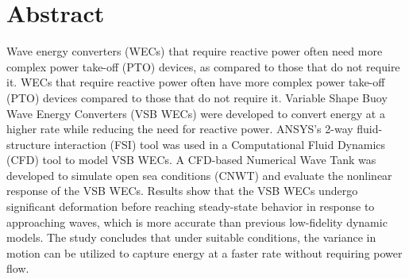 \section*{\centering\fontsize{14}{16}\selectfont Abstract}
\vspace{3\baselineskip}
\thispagestyle{plain}
{\justifying\fontsize{12}{14}\selectfont
Wave energy converters (WECs) that require reactive power often need more complex power
take-off (PTO) devices, as compared to those that do not require it. WECs that require reactive
power often have more complex power take-off (PTO) devices compared to those that do not
require it. Variable Shape Buoy Wave Energy Converters (VSB WECs) were developed to
convert energy at a higher rate while reducing the need for reactive power. ANSYS's 2-way
fluid-structure interaction (FSI) tool was used in a Computational Fluid Dynamics (CFD) tool to
model VSB WECs. A CFD-based Numerical Wave Tank was developed to simulate open sea
conditions (CNWT) and evaluate the nonlinear response of the VSB WECs. Results show that
the VSB WECs undergo significant deformation before reaching steady-state behavior in
response to approaching waves, which is more accurate than previous low-fidelity dynamic
models. The study concludes that under suitable conditions, the variance in motion can be
utilized to capture energy at a faster rate without requiring power flow.
}
\clearpage